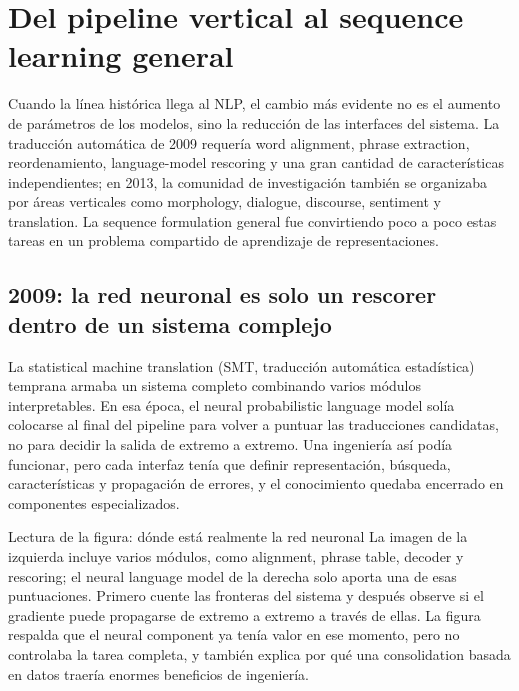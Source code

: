 \section{Del pipeline vertical al sequence learning general}

Cuando la línea histórica llega al NLP, el cambio más evidente no es el aumento de parámetros de los modelos, sino la reducción de las interfaces del sistema. La traducción automática de 2009 requería word alignment, phrase extraction, reordenamiento, language-model rescoring y una gran cantidad de características independientes; en 2013, la comunidad de investigación también se organizaba por áreas verticales como morphology, dialogue, discourse, sentiment y translation. La sequence formulation general fue convirtiendo poco a poco estas tareas en un problema compartido de aprendizaje de representaciones.

\subsection{2009: la red neuronal es solo un rescorer dentro de un sistema complejo}

La statistical machine translation (SMT, traducción automática estadística) temprana armaba un sistema completo combinando varios módulos interpretables. En esa época, el neural probabilistic language model solía colocarse al final del pipeline para volver a puntuar las traducciones candidatas, no para decidir la salida de extremo a extremo. Una ingeniería así podía funcionar, pero cada interfaz tenía que definir representación, búsqueda, características y propagación de errores, y el conocimiento quedaba encerrado en componentes especializados.


\begin{knowledgebox}{Lectura de la figura: dónde está realmente la red neuronal}
La imagen de la izquierda incluye varios módulos, como alignment, phrase table, decoder y rescoring; el neural language model de la derecha solo aporta una de esas puntuaciones. Primero cuente las fronteras del sistema y después observe si el gradiente puede propagarse de extremo a extremo a través de ellas. La figura respalda que el neural component ya tenía valor en ese momento, pero no controlaba la tarea completa, y también explica por qué una consolidation basada en datos traería enormes beneficios de ingeniería.
\end{knowledgebox}

